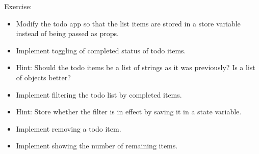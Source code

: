 \documentclass[presentation]{beamer}
\begin{document}
\begin{frame}[label={sec:orgheadline9}]{Exercise:}
\begin{itemize}
\item Modify the todo app so that the list items are stored in a store variable
instead of being passed as props.
\item Implement toggling of completed status of todo items.
\item Hint: Should the todo items be a list of strings as it was previously? Is a
list of objects better?
\item Implement filtering the todo list by completed items.
\item Hint: Store whether the filter is in effect by saving it in a state
variable.
\item Implement removing a todo item.
\item Implement showing the number of remaining items.
\end{itemize}
\end{frame}
\end{document}
